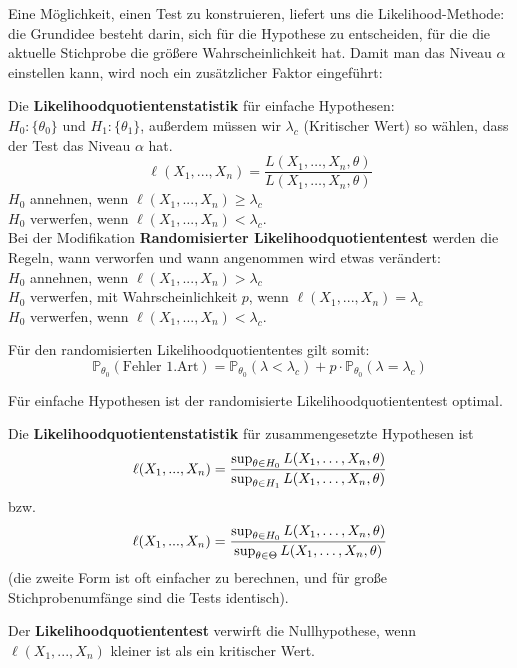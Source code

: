 Eine Möglichkeit, einen Test zu konstruieren, liefert uns die
Likelihood-Methode: die Grundidee besteht darin, sich für die
Hypothese zu entscheiden, für die die aktuelle Stichprobe die
größere Wahrscheinlichkeit hat. Damit man das Niveau $\alpha$ 
einstellen kann, wird noch ein zusätzlicher Faktor eingeführt:

\begin{definition}\label{def:likelihoodquotientenstatistik}
Die \textbf{Likelihoodquotientenstatistik} für einfache Hypothesen: \\
${H_0:\{\theta_0\}}$ und ${H_1:\{\theta_1\}}$, außerdem müssen wir $\lambda_c$ (Kritischer Wert) so wählen, dass der Test das Niveau $\alpha$ hat.
\[\ell(X_1,...,X_n)=\frac{L(X_1,\dots,X_n,\theta)}{L(X_1,\dots,X_n,\theta)}\]
$H_0$ annehnen, wenn $\ell(X_1,...,X_n)\geq\lambda_c$ \\
$H_0$ verwerfen, wenn $\ell(X_1,...,X_n)<\lambda_c$.\\

Bei der Modifikation \textbf{Randomisierter Likelihoodquotiententest} werden die Regeln, wann verworfen und wann angenommen wird etwas verändert:\\
$H_0$ annehnen, wenn $\ell(X_1,...,X_n)>\lambda_c$ \\
$H_0$ verwerfen, mit Wahrscheinlichkeit $p$, wenn $\ell(X_1,...,X_n)=\lambda_c$ \\
$H_0$ verwerfen, wenn $\ell(X_1,...,X_n)<\lambda_c$.
\end{definition}

Für den randomisierten Likelihoodquotiententes gilt somit:
\[\mathbb{P}_{\theta_0}(\text{Fehler 1.Art})=\mathbb{P}_{\theta_0}(\lambda<\lambda_c)+p\cdot\mathbb{P}_{\theta_0}(\lambda=\lambda_c)\]

\begin{satz}
Für einfache Hypothesen ist der randomisierte Likelihoodquotiententest optimal.
\end{satz}


\begin{definition}
Die \textbf{Likelihoodquotientenstatistik} für zusammengesetzte Hypothesen ist
\[\ell(X_1,...,X_n)={\sup_{\theta\in H_0}L(X_1,\dots,X_n,\theta)\over
\sup_{\theta\in H_1}L(X_1,\dots,X_n,\theta)}\]
bzw.
\[\ell(X_1,...,X_n)={\sup_{\theta\in H_0}L(X_1,\dots,X_n,\theta)\over
\sup_{\theta\in \Theta}L(X_1,\dots,X_n,\theta)}\]
(die zweite Form ist oft einfacher zu berechnen, und für große
Stichprobenumfänge sind die Tests identisch).

Der \textbf{Likelihoodquotiententest} verwirft die Nullhypothese, wenn $\ell(X_1,...,X_n)$
kleiner ist als ein kritischer Wert.
\end{definition}

